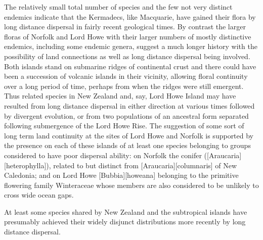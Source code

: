 The relatively small total number of species and the few not very distinct endemics indicate that the Kermadecs, like Macquarie, have gained their flora by long distance dispersal in fairly recent geological times.
By contrast the larger floras of Norfolk and Lord Howe with their larger numbers of mostly distinctive endemics, including some endemic genera, suggest a much longer history with the possibility of land connections as well as long distance dispersal being involved.
Both islands stand on submarine ridges of continental crust and there could have been a succession of volcanic islands in their vicinity, allowing floral continuity over a long period of time, perhaps from when the ridges were still emergent.
Thus related species in New Zealand and, say, Lord Howe Island may have resulted from long distance dispersal in either direction at various times followed by divergent evolution, or from two populations of an ancestral form separated following submergence of the Lord Howe Rise.
The suggestion of some sort of long term land continuity at the sites of Lord Howe and Norfolk is supported by the presence on each of these islands of at least one species belonging to groups considered to have poor dispersal ability: on Norfolk the conifer  ([Araucaria][heterophylla]), related to but distinct from [Araucaria][columnaris] of New Caledonia; and on Lord Howe [Bubbia][howeana] belonging to the primitive flowering family Winteraceae whose members are also considered to be unlikely to cross wide ocean gaps.

At least some species shared by New Zealand and the subtropical islands have presumably achieved their widely disjunct distributions more recently by long distance dispersal.
